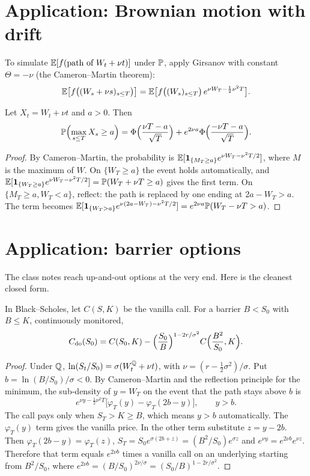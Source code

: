 \section{Application: Brownian motion with drift}\label{sec:drift}

To simulate $\mathbb{E}[f(\text{path of }W_t+\nu t)]$ under $\mathbb{P}$, apply Girsanov with constant $\Theta=-\nu$ (the Cameron--Martin theorem):
\[
\mathbb{E}\bigl[f\bigl((W_s+\nu s)_{s\le T}\bigr)\bigr]=\mathbb{E}\bigl[f\bigl((W_s)_{s\le T}\bigr)\,e^{\nu W_T-\frac12\nu^2T}\bigr].
\]

\begin{proposition}\label{prop:maxdrift}
Let $X_t=W_t+\nu t$ and $a>0$. Then
\[
\mathbb{P}\Bigl(\max_{s\le T}X_s\ge a\Bigr)=\Phi\Bigl(\frac{\nu T-a}{\sqrt T}\Bigr)+e^{2\nu a}\Phi\Bigl(\frac{-\nu T-a}{\sqrt T}\Bigr).
\]
\end{proposition}
\begin{proof}
By Cameron--Martin, the probability is $\mathbb{E}[\mathbf{1}_{\{M_T\ge a\}}e^{\nu W_T-\nu^2T/2}]$, where $M$ is the maximum of $W$. On $\{W_T\ge a\}$ the event holds automatically, and $\mathbb{E}[\mathbf{1}_{\{W_T\ge a\}}e^{\nu W_T-\nu^2T/2}]=\mathbb{P}(W_T+\nu T\ge a)$ gives the first term. On $\{M_T\ge a,W_T<a\}$, reflect: the path is replaced by one ending at $2a-W_T>a$. The term becomes $\mathbb{E}[\mathbf{1}_{\{W_T>a\}}e^{\nu(2a-W_T)-\nu^2T/2}]=e^{2\nu a}\mathbb{P}(W_T-\nu T>a)$.
\end{proof}

\section{Application: barrier options}\label{sec:barrier}

The class notes reach up-and-out options at the very end. Here is the cleanest closed form.

\begin{theorem}\label{thm:doc}
In Black--Scholes, let $C(S,K)$ be the vanilla call. For a barrier $B<S_0$ with $B\le K$, continuously monitored,
\[
C_{\rm do}(S_0)=C(S_0,K)-\Bigl(\frac{S_0}{B}\Bigr)^{1-2r/\sigma^2}C\Bigl(\frac{B^2}{S_0},K\Bigr).
\]
\end{theorem}
\begin{proof}
Under $\mathbb{Q}$, $\ln(S_t/S_0)=\sigma(W_t^{\mathbb{Q}}+\nu t)$, with $\nu=(r-\tfrac12\sigma^2)/\sigma$. Put $b=\ln(B/S_0)/\sigma<0$. By Cameron--Martin and the reflection principle for the minimum, the sub-density of $y=W_T$ on the event that the path stays above $b$ is
\[
e^{\nu y-\frac12\nu^2T}\bigl[\varphi_T(y)-\varphi_T(2b-y)\bigr],\qquad y>b.
\]
The call pays only when $S_T>K\ge B$, which means $y>b$ automatically. The $\varphi_T(y)$ term gives the vanilla price. In the other term substitute $z=y-2b$. Then $\varphi_T(2b-y)=\varphi_T(z)$, $S_T=S_0e^{\sigma(2b+z)}=(B^2/S_0)e^{\sigma z}$ and $e^{\nu y}=e^{2\nu b}e^{\nu z}$. Therefore that term equals $e^{2\nu b}$ times a vanilla call on an underlying starting from $B^2/S_0$, where $e^{2\nu b}=(B/S_0)^{2\nu/\sigma}=(S_0/B)^{1-2r/\sigma^2}$.
\end{proof}

